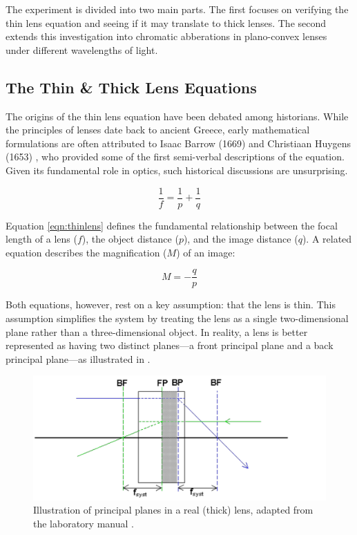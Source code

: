 \documentclass[aip, cp, amsmath, amssymb, reprint, nofootinbib]{revtex4-2}
\begin{document}
        The experiment is divided into two main parts. The first focuses on verifying the thin lens equation and seeing if it may translate to thick lenses. The second extends this investigation into chromatic abberations in plano-convex lenses under different wavelengths of light.

        \subsection{The Thin \& Thick Lens Equations}
        
        The origins of the thin lens equation have been debated among historians. While the principles of lenses date back to ancient Greece, early mathematical formulations are often attributed to Isaac Barrow (1669) and Christiaan Huygens (1653) \cite{historyoptics}, who provided some of the first semi-verbal descriptions of the equation. Given its fundamental role in optics, such historical discussions are unsurprising.
        
        \begin{equation} \label{eqn:thinlens}
            \frac{1}{f} = \frac{1}{p} + \frac{1}{q}
        \end{equation}
        
        Equation \eqref{eqn:thinlens} defines the fundamental relationship between the focal length of a lens ($f$), the object distance ($p$), and the image distance ($q$). A related equation describes the magnification ($M$) of an image:
        
        \begin{equation} \label{eqn:mag}
            M = -\frac{q}{p}
        \end{equation}
        
        Both equations, however, rest on a key assumption: that the lens is thin. This assumption simplifies the system by treating the lens as a single two-dimensional plane rather than a three-dimensional object. In reality, a lens is better represented as having two distinct planes—a front principal plane and a back principal plane—as illustrated in .
        
        \begin{figure}[H]
            \includegraphics[width=0.8\linewidth]{figures/fp-bp.png}
            \caption{Illustration of principal planes in a real (thick) lens, adapted from the laboratory manual \cite{labmanual}.}
            \label{fig:real-lens}
        \end{figure}
        
\end{document}
